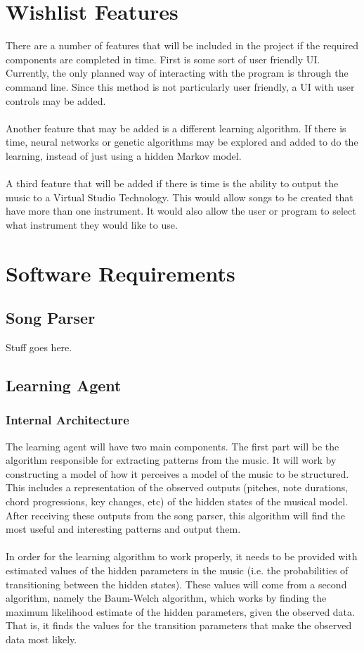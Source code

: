 \documentclass{article}
\begin{document}
\section{Wishlist Features}
There are a number of features that will be included in the project if the required components are completed in time. First is some sort of user friendly UI. Currently, the only planned way of interacting with the program is through the command line. Since this method is not particularly user friendly, a UI with user controls may be added.\\
\\
Another feature that may be added is a different learning algorithm. If there is time, neural networks or genetic algorithms may be explored and added to do the learning, instead of just using a hidden Markov model.\\
\\
A third feature that will be added if there is time is the ability to output the music to a Virtual Studio Technology. This would allow songs to be created that have more than one instrument. It would also allow the user or program to select what instrument they would like to use.

\section{Software Requirements}
\subsection{Song Parser}
Stuff goes here.

\subsection{Learning Agent}
\subsubsection{Internal Architecture}
The learning agent will have two main components. The first part will be the algorithm responsible for extracting patterns from the music. It will work by constructing a model of how it perceives a model of the music to be structured. This includes a representation of the observed outputs (pitches, note durations, chord progressions, key changes, etc) of the hidden states of the musical model. After receiving these outputs from the song parser, this algorithm will find the most useful and interesting patterns and output them.\\
\\
In order for the learning algorithm to work properly, it needs to be provided with estimated values of the hidden parameters in the music (i.e. the probabilities of transitioning between the hidden states). These values will come from a second algorithm, namely the Baum-Welch algorithm, which works by finding the maximum likelihood estimate of the hidden parameters, given the observed data. That is, it finds the values for the transition parameters that make the observed data most likely. 
\end{document}
